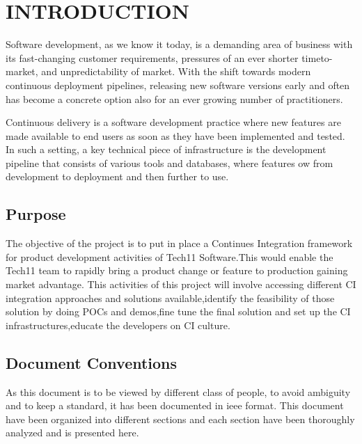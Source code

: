 \documentclass[12pt,a4paper,oneside]{report}
\renewcommand{\footrulewidth}{1.2pt}
\renewcommand{\headrulewidth}{1.2pt}
\begin{document}
\tableofcontents
\renewcommand*\thesection{\thechapter.\arabic{section}}
\newpage
{}
\setcounter{page}{1}
\pagestyle{fancy}
\headheight 26pt
\renewcommand{\footrulewidth}{1.2pt}
\renewcommand{\headrulewidth}{1.2pt}
\rhead{\scriptsize {\leftmark}}
\rfoot{\thepage}
\cfoot{\empty}
   

\chapter{INTRODUCTION}
\setcounter{page}{1}
Software development, as we know it today, is a demanding area of business
with its fast-changing customer requirements, pressures of an ever shorter timeto-
market, and unpredictability of market. With the shift towards modern continuous deployment
pipelines, releasing new software versions early and often has become a concrete
option also for an ever growing number of practitioners. 
\par
Continuous delivery is a software development practice where
new features are made available to end users as soon as they have been
implemented and tested. In such a setting, a key technical piece of infrastructure
is the development pipeline that consists of various tools
and databases, where features 
ow from development to deployment and
then further to use.


\section{Purpose}
The objective of the project is to put in place a Continues Integration framework for product
development activities of Tech11 Software.This would enable the Tech11 team to rapidly bring a
product change or feature to production gaining market advantage.
This activities of this project will involve accessing different CI integration approaches and
solutions available,identify the feasibility of those solution by doing POCs and demos,fine tune the
final solution and set up the CI infrastructures,educate the developers on CI culture.

\newpage
\section{Document Conventions}
As this document is to be viewed by different class of people, to avoid ambiguity and to keep a standard, it has been documented in ieee format. This document have been organized into different sections and each section have been thoroughly analyzed and is presented here. 
\end{document}
